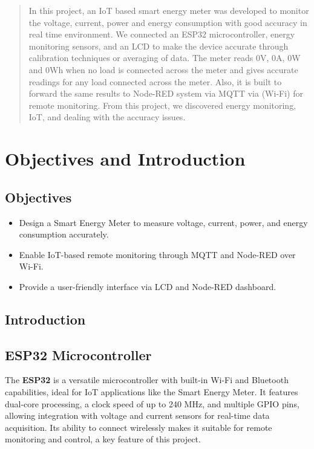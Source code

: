 \documentclass[a4paper,12pt]{report}
\begin{document}
 
 \setcounter{chapter}{1}
\begin{abstract} 
 
In this project, an IoT based smart energy meter was developed to monitor the voltage, current, power and energy consumption with good accuracy in real time environment. We connected an ESP32 microcontroller, energy monitoring sensors, and an LCD to make the device accurate through calibration techniques or averaging of data. The meter reads 0V, 0A, 0W and 0Wh when no load is connected across the meter and gives accurate readings for any load connected across the meter. Also, it is built to forward the same results to Node-RED system via MQTT via (Wi-Fi) for remote monitoring. From this project, we discovered energy monitoring, IoT, and dealing with the accuracy issues.

\end{abstract} 
\pagebreak 
\tableofcontents  
\pagebreak 

\section{Objectives and Introduction}\label{ch:intro}

\subsection{Objectives}
\begin{itemize}
    \item Design a Smart Energy Meter to measure voltage, current, power, and energy consumption accurately.
    \item Enable IoT-based remote monitoring through MQTT and Node-RED over Wi-Fi.
    \item Provide a user-friendly interface via LCD and Node-RED dashboard.
\end{itemize}

\subsection{Introduction}
\subsection{ESP32 Microcontroller}  
The \textbf{ESP32} is a versatile microcontroller with built-in Wi-Fi and Bluetooth capabilities, ideal for IoT applications like the Smart Energy Meter. It features dual-core processing, a clock speed of up to 240 MHz, and multiple GPIO pins, allowing integration with voltage and current sensors for real-time data acquisition. Its ability to connect wirelessly makes it suitable for remote monitoring and control, a key feature of this project.  
\end{document}
